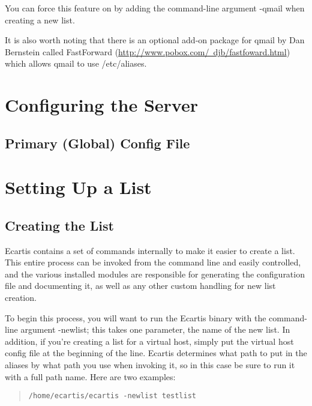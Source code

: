 \documentclass{book}
\begin{document}
You can force this feature on by adding the command-line argument -qmail when
creating a new list.
   
It is also worth noting that there is an optional add-on package for qmail by
Dan Bernstein called FastForward
(\href{http://www.pobox.com/~djb/fastfoward.html}{http://www.pobox.com/~djb/fastfoward.html}) which allows qmail to use
/etc/aliases.
   
\chapter{Configuring the Server}
\label{configuring}

\section{Primary (Global) Config File}
\label{configuring:global}

   
\chapter{Setting Up a List}
\label{newlist}

\section{Creating the List}
\label{newlist:create}

Ecartis contains a set of commands internally to make it easier to create a
list. This entire process can be invoked from the command line and easily
controlled, and the various installed modules are responsible for generating
the configuration file and documenting it, as well as any other custom
handling for new list creation.
   
To begin this process, you will want to run the Ecartis binary with the
command-line argument -newlist; this takes one parameter, the name of the new
list. In addition, if you're creating a list for a virtual host, simply put
the virtual host config file at the beginning of the line. Ecartis determines
what path to put in the aliases by what path you use when invoking it, so in
this case be sure to run it with a full path name. Here are two examples:

\begin{quote} 
\footnotesize
\begin{verbatim}
/home/ecartis/ecartis -newlist testlist
\end{verbatim}
\end{quote}
\end{document}
